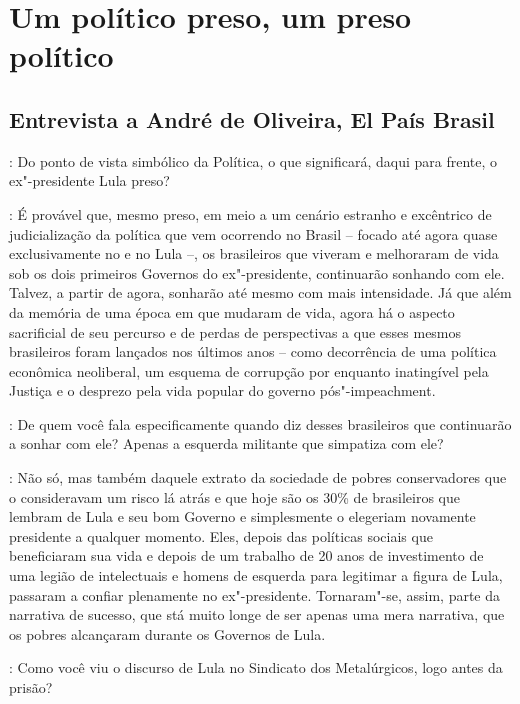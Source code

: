 \chapter{Um político preso, um preso político}

\section{Entrevista a André de Oliveira, El País Brasil}

\noindent{}: Do ponto de vista simbólico da Política, o que significará, daqui para
frente, o ex"-presidente Lula preso?

\noindent{}: É provável que, mesmo preso, em meio a um cenário estranho e excêntrico
de judicialização da política que vem ocorrendo no Brasil -- focado até
agora quase exclusivamente no  e no Lula --, os brasileiros que
viveram e melhoraram de vida sob os dois primeiros Governos do
ex"-presidente, continuarão sonhando com ele. Talvez, a partir de agora,
sonharão até mesmo com mais intensidade. Já que além da memória de uma
época em que mudaram de vida, agora há o aspecto sacrificial de seu
percurso e de perdas de perspectivas a que esses mesmos brasileiros
foram lançados nos últimos anos -- como decorrência de uma política
econômica neoliberal, um esquema de corrupção por enquanto inatingível
pela Justiça e o desprezo pela vida popular do governo pós"-impeachment.

\smallskip

\noindent{}: De quem você fala especificamente quando diz desses brasileiros que
continuarão a sonhar com ele? Apenas a esquerda militante que simpatiza
com ele?

\noindent{}: Não só, mas também daquele extrato da sociedade de pobres conservadores
que o consideravam um risco lá atrás e que hoje são os 30\% de
brasileiros que lembram de Lula e seu bom Governo e simplesmente o
elegeriam novamente presidente a qualquer momento. Eles, depois das
políticas sociais que beneficiaram sua vida e depois de um trabalho de
20 anos de investimento de uma legião de intelectuais e homens de
esquerda para legitimar a figura de Lula, passaram a confiar plenamente
no ex"-presidente. Tornaram"-se, assim, parte da narrativa de sucesso, que
stá muito longe de ser apenas uma mera narrativa, que os pobres
alcançaram durante os Governos de Lula.

\smallskip

\noindent{}: Como você viu o discurso de Lula no Sindicato dos Metalúrgicos, logo
antes da prisão?

